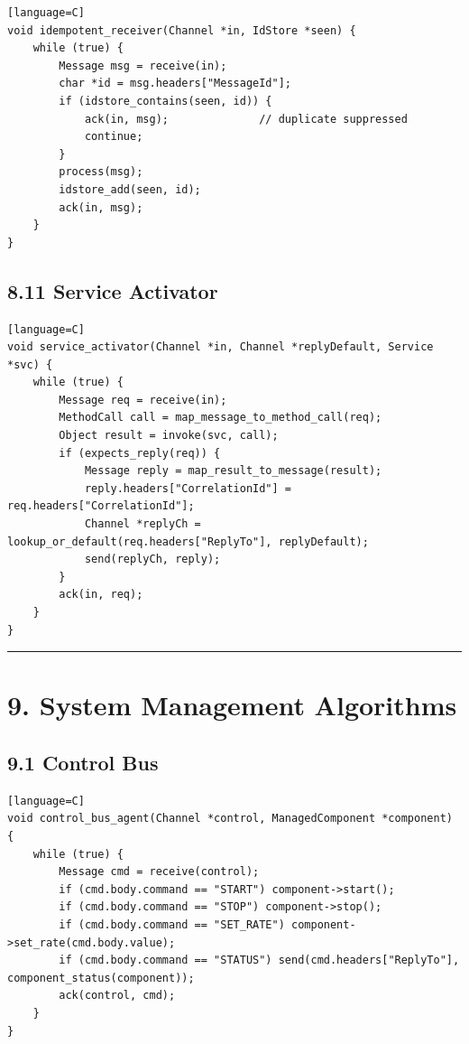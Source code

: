 \documentclass[11pt]{article}
\begin{document}
\begin{verbatim}[language=C]
void idempotent_receiver(Channel *in, IdStore *seen) {
    while (true) {
        Message msg = receive(in);
        char *id = msg.headers["MessageId"];
        if (idstore_contains(seen, id)) {
            ack(in, msg);              // duplicate suppressed
            continue;
        }
        process(msg);
        idstore_add(seen, id);
        ack(in, msg);
    }
}
\end{verbatim}

\subsection{8.11 Service Activator}\label{service-activator}

\begin{verbatim}[language=C]
void service_activator(Channel *in, Channel *replyDefault, Service *svc) {
    while (true) {
        Message req = receive(in);
        MethodCall call = map_message_to_method_call(req);
        Object result = invoke(svc, call);
        if (expects_reply(req)) {
            Message reply = map_result_to_message(result);
            reply.headers["CorrelationId"] = req.headers["CorrelationId"];
            Channel *replyCh = lookup_or_default(req.headers["ReplyTo"], replyDefault);
            send(replyCh, reply);
        }
        ack(in, req);
    }
}
\end{verbatim}

\begin{center}\rule{0.5\linewidth}{0.5pt}\end{center}

\section{9. System Management
Algorithms}\label{system-management-algorithms}

\subsection{9.1 Control Bus}\label{control-bus}

\begin{verbatim}[language=C]
void control_bus_agent(Channel *control, ManagedComponent *component) {
    while (true) {
        Message cmd = receive(control);
        if (cmd.body.command == "START") component->start();
        if (cmd.body.command == "STOP") component->stop();
        if (cmd.body.command == "SET_RATE") component->set_rate(cmd.body.value);
        if (cmd.body.command == "STATUS") send(cmd.headers["ReplyTo"], component_status(component));
        ack(control, cmd);
    }
}
\end{verbatim}
\end{document}
